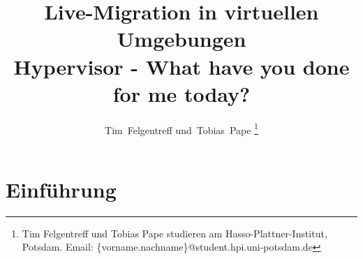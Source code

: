 \documentclass[draft,journal]{IEEEtran}
\makeatletter
\def\markboth#1#2{\def\leftmark{\@IEEEcompsoconly{\sffamily}\MakeUppercase{\protect#1}}%
\def\rightmark{\@IEEEcompsoconly{\sffamily}\MakeUppercase{\protect#2}}}
\makeatother
\begin{document}
\title{Live-Migration in virtuellen Umgebungen\\
  \large{Hypervisor - What have you done for me today?}
}
\author{Tim~Felgentreff und~Tobias~Pape%
\thanks{%
  Tim Felgentreff und Tobias Pape studieren am
  Hasso-Plattner-Institut, Potsdam.\goodbreak
  Email: \{vorname.nachname\}@student.hpi.uni-potsdam.de}%
}
\markboth{Industrieseminar Cloud-Computing}{Felgentreff, Pape: Live-Migration}

\maketitle
\tableofcontents

\begin{abstract}
  
\end{abstract}

\IEEEpeerreviewmaketitle

\section{Einführung}
\label{sec:einfuehrung}

\end{document}
